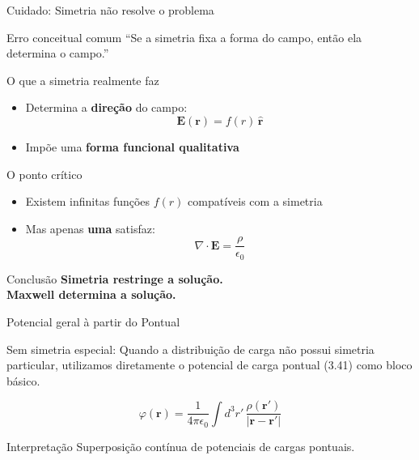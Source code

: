 \documentclass[aspectratio=169,11pt]{beamer}
\begin{document}
\begin{frame}{Cuidado: Simetria não resolve o problema}

\begin{alertblock}{Erro conceitual comum}
``Se a simetria fixa a forma do campo, então ela determina o campo.''
\end{alertblock}

\vspace{0.3cm}

\begin{mybox}{O que a simetria realmente faz}
\begin{itemize}
\item Determina a \textbf{direção} do campo:
\[
\mathbf{E}(\mathbf r)=f(r)\,\hat{\mathbf r}
\]
\item Impõe uma \textbf{forma funcional qualitativa}
\end{itemize}
\end{mybox}

\end{frame}

\begin{frame}

\begin{alertblock}{O ponto crítico}
\begin{itemize}
\item Existem infinitas funções \(f(r)\) compatíveis com a simetria
\item Mas apenas \textbf{uma} satisfaz:
\[
\nabla \cdot \mathbf{E} = \frac{\rho}{\epsilon_0}
\]
\end{itemize}
\end{alertblock}

\vspace{0.3cm}

\begin{mybox}{Conclusão}
\centering
\textbf{Simetria restringe a solução.}\\
\textbf{Maxwell determina a solução.}
\end{mybox}

\end{frame}


\begin{frame}{Potencial geral à partir do Pontual}

\begin{mybox}{Sem simetria especial:}
Quando a distribuição de carga não possui simetria particular,
utilizamos diretamente o potencial de carga pontual (3.41) como bloco básico.
\end{mybox}

\begin{eqbox}
\begin{equation}
\varphi(\mathbf r)
=
\frac{1}{4\pi\epsilon_0}
\int d^3 r'\,
\frac{\rho(\mathbf r')}{|\mathbf r - \mathbf r'|}
\tag{3.46}
\end{equation}
\end{eqbox}

\begin{alertblock}{Interpretação}
Superposição contínua de potenciais de cargas pontuais.
\end{alertblock}

\end{frame}
\end{document}
